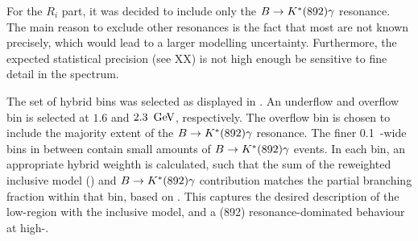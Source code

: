For the $R_i$ part, it was decided to include only the $B\rightarrow K^*(892)\gamma$ resonance.
The main reason to exclude other resonances is the fact that most are not known precisely, which would lead to a larger modelling uncertainty.
Furthermore, the expected statistical precision (see XX) is not high enough be sensitive to fine detail in the spectrum.

The set of hybrid bins was selected as displayed in .
An underflow and overflow bin is selected at $1.6$ and $2.3~\mathrm{\,Ge\kern -0.1em V}$, respectively.
The overflow bin is chosen to include the majority extent of the $B\rightarrow K^*(892)\gamma$ resonance.
The finer 0.1~\gev-wide bins in between contain small amounts of $B\rightarrow K^*(892)\gamma$ events.
In each \EB bin, an appropriate hybrid weighth is calculated, such that the sum of the reweighted inclusive model () and $B\rightarrow K^*(892)\gamma$ contribution matches the partial branching fraction within that \EB bin, based on .
This captures the desired description of the low-\EB region with the inclusive model, and a \Kstar(892) resonance-dominated behaviour at high-\EB.

